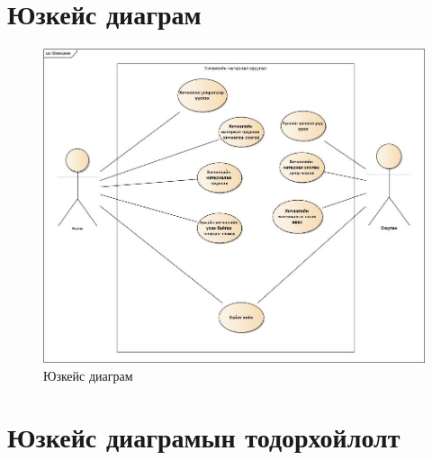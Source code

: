 \section{Юзкейс диаграм}
	\begin{figure}[htbp]
		\centering
		\includegraphics[scale=0.5]{Diagrams/UseCase}
		\caption[Юзкейс диаграм]{Юзкейс диаграм}
		\label{fit:UseCase}
	\end{figure}


\section{Юзкейс диаграмын тодорхойлолт}

